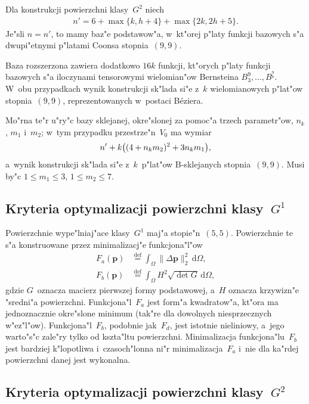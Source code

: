 Dla konstrukcji powierzchni klasy~$G^2$ niech
\begin{align*}
  n' = 6+\max\{k,h+4\}+\max\{2k,2h+5\}.
\end{align*}
Je"sli $n=n'$, to mamy baz"e podstawow"a, w~kt"orej p"laty funkcji bazowych s"a
dwupi"etnymi p"latami Coonsa stopnia~$(9,9)$.

Baza rozszerzona zawiera dodatkowo $16k$ funkcji, kt"orych p"laty funkcji bazowych
s"a iloczynami tensorowymi wielomian"ow Bernsteina $B^9_3,\ldots,B^^9_6$.
W~obu przypadkach wynik konstrukcji sk"lada si"e z~$k$ wielomianowych p"lat"ow
stopnia~$(9,9)$, reprezentowanych w~postaci B\'{e}ziera.

Mo"rna te"r u"ry"c bazy sklejanej, okre"slonej za pomoc"a trzech parametr"ow,
$n_k$, $m_1$ i~$m_2$; w~tym przypadku przestrze"n~$V_0$ ma wymiar
\begin{align*}
  n' + k\bigl((4+n_km_2)^2+3n_km_1\bigr),
\end{align*}
a~wynik konstrukcji sk"lada si"e z~$k$~p"lat"ow B-sklejanych stopnia~$(9,9)$.
Musi by"c $1\leq m_1\leq 3$, $1\leq m_2\leq 7$.


\subsection{Kryteria optymalizacji powierzchni klasy~$G^1$}

Powierzchnie wype"lniaj"ace klasy~$G^1$ maj"a stopie"n~$(5,5)$.
Powierzchnie te s"a konstruowane przez minimalizacj"e
funkcjona"l"ow
\begin{align*}
  F_a(\bm{p}) &{}\stackrel{\mathrm{def}}{=}
  \int_{\varOmega}\|\Delta\bm{p}\|_2^2\,\mathrm{d}\varOmega, \\
  F_b(\bm{p}) &{}\stackrel{\mathrm{def}}{=}
  \int_{\varOmega}H^2\sqrt{\det G}\,\mathrm{d}\varOmega,
\end{align*}
gdzie $G$~oznacza macierz pierwszej formy podstawowej, a~$H$ oznacza
krzywizn"e "sredni"a powierzchni. Funkcjona"l~$F_a$ jest
form"a kwadratow"a, kt"ora ma jednoznacznie okre"slone minimum
(tak"re dla dowolnych niesprzecznych w"ez"l"ow).
Funkcjona"l~$F_b$, podobnie jak~$F_d$, jest istotnie nieliniowy,
a~jego warto"s"c zale"ry tylko od kszta"ltu powierzchni.
Minimalizacja funkcjona"lu~$F_b$ jest bardziej k"lopotliwa i~czasoch"lonna ni"r
minimalizacja~$F_a$ i~nie dla ka"rdej powierzchni danej jest wykonalna.


\subsection{Kryteria optymalizacji powierzchni klasy~$G^2$}

